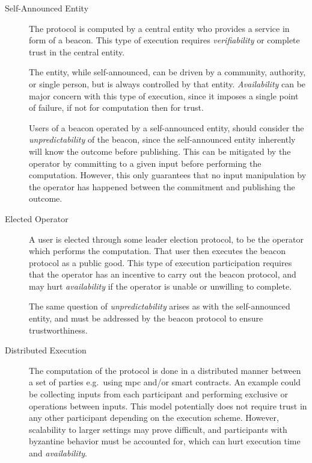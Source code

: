 \begin{description}
    \item[Self-Announced Entity]
        The protocol is computed by a central entity who provides a service in form of a beacon.
        This type of execution requires \emph{verifiability} or complete trust in the central entity.

        The entity, while self-announced, can be driven by a community, authority, or single person, but is always controlled by that entity.
        \emph{Availability} can be major concern with this type of execution, since it imposes a single point of failure, if not for computation then for trust.

        Users of a beacon operated by a self-announced entity, should consider the \emph{unpredictability} of the beacon, since the self-announced entity inherently will know the outcome before publishing.
        This can be mitigated by the operator by committing to a given input before performing the computation.
        However, this only guarantees that no input manipulation by the operator has happened between the commitment and publishing the outcome.

    \item[Elected Operator]
        A user is elected through some leader election protocol, to be the operator which performs the computation.
        That user then executes the beacon protocol as a public good.
        This type of execution participation requires that the operator has an incentive to carry out the beacon protocol, and may hurt \emph{availability} if the operator is unable or unwilling to complete.

        The same question of \emph{unpredictability} arises as with the self-announced entity, and must be addressed by the beacon protocol to ensure trustworthiness.

    \item[Distributed Execution]
        The computation of the protocol is done in a distributed manner between a set of parties e.g.\ using \gls{mpc} and/or smart contracts.
        An example could be collecting inputs from each participant and performing exclusive or operations between inputs.
        This model potentially does not require trust in any other participant depending on the execution scheme.
        However, scalability to larger settings may prove difficult, and participants with byzantine behavior must be accounted for, which can hurt execution time and \emph{availability}.


\end{description}
